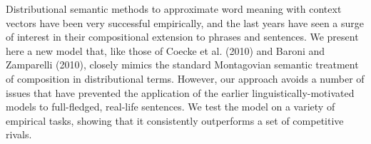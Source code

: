 Distributional semantic methods to approximate word meaning with context vectors have been very successful empirically, and the last years have seen a surge of interest in their compositional extension to phrases and sentences. We present here a new model that, like those of Coecke et al. (2010) and Baroni and Zamparelli (2010), closely mimics the standard Montagovian semantic treatment of composition in distributional terms. However, our approach avoids a number of issues that have prevented the application of the earlier linguistically-motivated models to full-fledged, real-life sentences. We test the model on a variety of empirical tasks, showing that it consistently outperforms a set of competitive rivals.
